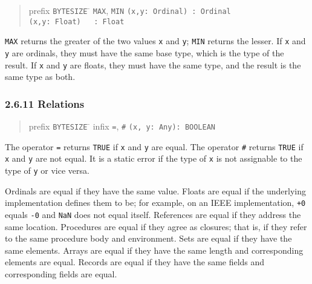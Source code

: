 \documentclass[10pt]{article}
\begin{document}
\begin{quote}
  \begin{tabbing}
    prefix \= \verb|BYTESIZE| \= \kill
           \> \verb|MAX|, \verb|MIN| \> \verb|(x,y: Ordinal) : Ordinal| \\
           \>                        \> \verb|(x,y: Float)   : Float|
  \end{tabbing}
\end{quote}
\verb|MAX| returns the greater of the two values \verb|x| and \verb|y|;
\verb|MIN| returns the lesser.  If \verb|x| and \verb|y| are ordinals, they
must have the same base type, which is the type of the result.  If \verb|x|
and \verb|y| are floats, they must have the same type, and the result is the
same type as both.

\subsubsection*{2.6.11 Relations}

\begin{quote}
  \begin{tabbing}
    prefix \= \verb|BYTESIZE| \= \kill
    infix  \> \verb|=|, \verb|#|     \> \verb|(x, y: Any): BOOLEAN|
  \end{tabbing}
\end{quote}
The operator \verb|=| returns \verb|TRUE| if \verb|x| and \verb|y| are equal.
The operator \verb|#| returns \verb|TRUE| if \verb|x| and \verb|y| are not
equal.  It is a static error if the type of \verb|x| is not assignable to the
type of \verb|y| or vice versa.

Ordinals are equal if they have the same value.  Floats are equal if the
underlying implementation defines them to be; for example, on an IEEE
implementation, \verb|+0| equals \verb|-0| and \verb|NaN| does not equal
itself.  References are equal if they address the same location.  Procedures
are equal if they agree as closures; that is, if they refer to the same
procedure body and environment.  Sets are equal if they have the same
elements.  Arrays are equal if they have the same length and corresponding
elements are equal.  Records are equal if they have the same fields and
corresponding fields are equal.
\end{document}

